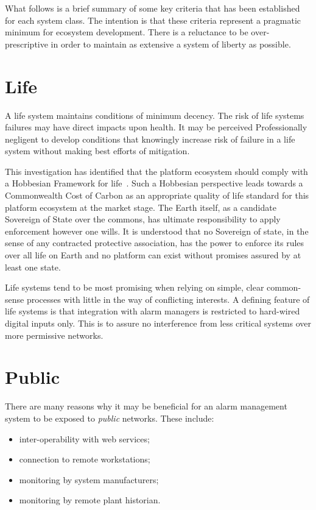\documentclass[11pt, oneside]{book}   	%
\begin{document}
\pagebreak

What follows is a brief summary of some key criteria that has been established for each system class.
The intention is that these criteria represent a pragmatic minimum for ecosystem development.
There is a reluctance to be over-prescriptive in order to maintain as extensive a system of liberty as possible.

\section{Life}
A life system maintains conditions of minimum decency.
The risk of life systems failures may have direct impacts upon health.
It may be perceived Professionally negligent to develop conditions that knowingly increase risk of failure in a life system without making best efforts of mitigation.\

This investigation has identified that the platform ecosystem should comply with a Hobbesian Framework for life~\cite{th1}.
Such a Hobbesian perspective leads towards a Commonwealth Cost of Carbon as an appropriate quality of life standard for this platform ecosystem at the market stage.
The Earth itself, as a candidate Sovereign of State over the commons, has ultimate responsibility to apply enforcement however one wills.
It is understood that no Sovereign of state, in the sense of any contracted protective association, has the power to enforce its rules over all life on Earth and no platform can exist without promises assured by at least one state.\

Life systems tend to be most promising when relying on simple, clear common-sense processes with little in the way of conflicting interests.
A defining feature of life systems is that integration with alarm managers is restricted to hard-wired digital inputs only.
This is to assure no interference from less critical systems over more permissive networks.\

\section{Public}

There are many reasons why it may be beneficial for an alarm management system to be exposed to \emph{public} networks.
These include:
\begin{itemize}
	\item inter-operability with web services; 
	\item connection to remote workstations;
	\item monitoring by system manufacturers;
	\item monitoring by remote plant historian.
\end{itemize}\
\end{document}
